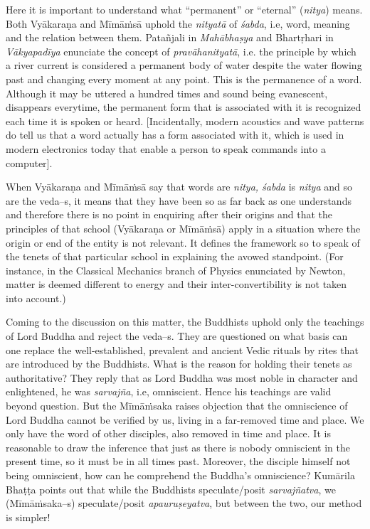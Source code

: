 Here it is important to understand what “permanent” or “eternal” (\textit{nitya}) means. Both {Vyākaraṇa} and Mīmāṁsā uphold the \textit{nityatā} of \textit{śabda}, i.e, word, meaning and the relation between them. Patañjali in \textit{Mahābhaṣya} and Bhartṛhari in \textit{Vākyapadīya} enunciate the concept of \textit{pravāhanityatā}, i.e. the principle by which a river current is considered a permanent body of water despite the water flowing past and changing every moment at any point. This is the permanence of a word. Although it may be uttered a hundred times and sound being evanescent, disappears everytime, the permanent form that is associated with it is recognized each time it is spoken or heard. [Incidentally, modern acoustics and wave patterns do tell us that a word actually has a form associated with it, which is used in modern electronics today that enable a person to speak commands into a computer].

When {Vyākaraṇa} and Mīmāṁsā say that words are \textit{nitya, śabda} is \textit{nitya} and so are the veda--s, it means that they have been so as far back as one understands and therefore there is no point in enquiring after their origins and that the principles of that school ({Vyākaraṇa} or Mīmāṁsā) apply in a situation where the origin or end of the entity is not relevant. It defines the framework so to speak of the tenets of that particular school in explaining the avowed standpoint. (For instance, in the Classical Mechanics branch of Physics enunciated by Newton, matter is deemed different to energy and their inter-convertibility is not taken into account.)

Coming to the discussion on this matter, the Buddhists uphold only the teachings of Lord Buddha and reject the veda--s. They are questioned on what basis can one replace the well-established, prevalent and ancient Vedic rituals by rites that are introduced by the Buddhists. What is the reason for holding their tenets as authoritative? They reply that as Lord Buddha was most noble in character and enlightened, he was \textit{sarvajña}, i.e, omniscient. Hence his teachings are valid beyond question. But the Mīmāṁsaka raises objection that the omniscience of Lord Buddha cannot be verified by us, living in a far-removed time and place. We only have the word of other disciples, also removed in time and place. It is reasonable to draw the inference that just as there is nobody omniscient in the present time, so it must be in all times past. Moreover, the disciple himself not being omniscient, how can he comprehend the Buddha’s omniscience? Kumārila Bhaṭṭa points out that while the Buddhists speculate/posit \textit{sarvajñatva}, we (Mīmāṁsaka--s) speculate/posit \textit{apauruṣeyatva}, but between the two, our method is simpler!

